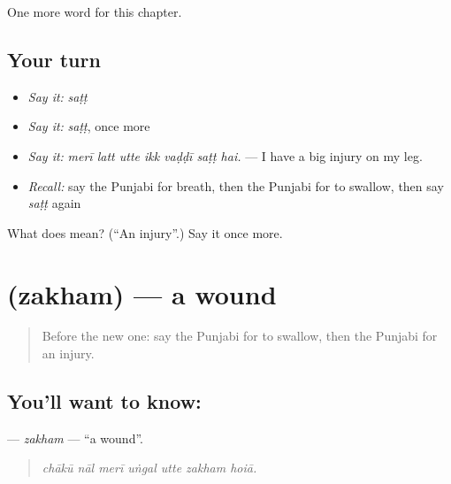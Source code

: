 \begin{grammarlens}[title={What you've built}]
One more word for this chapter.
\end{grammarlens}

\subsection*{Your turn}
\begin{itemize}
\raggedright
  \item \emph{Say it:} \emph{saṭṭ}
  \item \emph{Say it:} \emph{saṭṭ}, once more
  \item \emph{Say it:} \emph{merī latt utte ikk vaḍḍī saṭṭ hai.} — I have a big injury on my leg.
  \item \emph{Recall:} say the Punjabi for breath, then the Punjabi for to swallow, then say \emph{saṭṭ} again
\end{itemize}

\begin{tcolorbox}[breakable,colback=teal!4,colframe=teal!35!black,title={Before you move on}]
What does  mean? (\textquotedblleft{}An injury\textquotedblright{}.) Say it once more.
\end{tcolorbox}
\section[\texorpdfstring{\pa{ਜ਼ਖ਼ਮ} (zakham)}{ਜ਼ਖ਼ਮ (zakham)}]{ (zakham) — a wound}

\label{lesson:PA-C322-zakham}



\begin{quote}
Before the new one: say the Punjabi for to swallow, then the Punjabi for an injury.
\end{quote}

\subsection*{You'll want to know: }
\textbf{} — \emph{zakham} — \textquotedblleft{}a wound\textquotedblright{}.

\begin{quote}
      
\end{quote}

\begin{quote}
\emph{chākū nāl merī uṅgal utte zakham hoiā.}
\end{quote}

